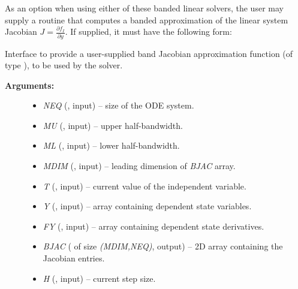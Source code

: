 \documentclass[letterpaper,10pt,english]{sphinxmanual}
\begin{document}
As an option when using either of these banded linear solvers, the user
may supply a routine that computes a banded approximation of the
linear system Jacobian \(J = \frac{\partial f_I}{\partial y}\). If
supplied, it must have the following form:

\begin{fulllineitems}
\label{f_interface/Usage:f/_/FARKBJAC}
Interface to provide a user-supplied band Jacobian approximation
function (of type {\hyperref[c_interface/User_supplied:c.ARKDlsBandJacFn]{\emph{}}}), to be used by the
{\hyperref[f_interface/Usage:f/_/FARKBAND]{\emph{}}} solver.
\begin{description}
\item[{\textbf{Arguments:}}] \leavevmode\begin{itemize}
\item {} 
\emph{NEQ} (, input) -- size of the ODE system.

\item {} 
\emph{MU}   (, input) -- upper half-bandwidth.

\item {} 
\emph{ML}   (, input) -- lower half-bandwidth.

\item {} 
\emph{MDIM} (, input) -- leading dimension of \emph{BJAC} array.

\item {} 
\emph{T}    (, input) -- current value of the independent variable.

\item {} 
\emph{Y}    (, input) -- array containing dependent state variables.

\item {} 
\emph{FY}   (, input) -- array containing dependent state derivatives.

\item {} 
\emph{BJAC} ( of size \emph{(MDIM,NEQ)}, output) -- 2D array
containing the Jacobian entries.

\item {} 
\emph{H}    (, input) -- current step size.


\end{itemize}
\end{description}
\end{fulllineitems}
\end{document}
